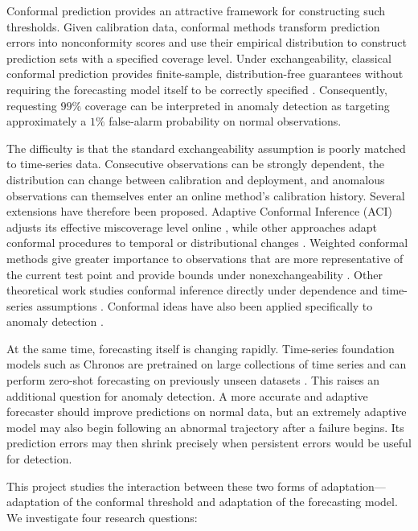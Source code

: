 \documentclass[11pt]{article}
\theoremstyle{definition}
\theoremstyle{remark}
\begin{document}
Conformal prediction provides an attractive framework for constructing such thresholds. Given calibration data, conformal methods transform prediction errors into nonconformity scores and use their empirical distribution to construct prediction sets with a specified coverage level. Under exchangeability, classical conformal prediction provides finite-sample, distribution-free guarantees without requiring the forecasting model itself to be correctly specified \cite{vovk2005algorithmic,lei2018distribution,angelopoulos2023gentle}. Consequently, requesting $99\%$ coverage can be interpreted in anomaly detection as targeting approximately a $1\%$ false-alarm probability on normal observations.

The difficulty is that the standard exchangeability assumption is poorly matched to time-series data. Consecutive observations can be strongly dependent, the distribution can change between calibration and deployment, and anomalous observations can themselves enter an online method's calibration history. Several extensions have therefore been proposed. Adaptive Conformal Inference (ACI) adjusts its effective miscoverage level online \cite{gibbs2021adaptive}, while other approaches adapt conformal procedures to temporal or distributional changes \cite{zaffran2022adaptive}. Weighted conformal methods give greater importance to observations that are more representative of the current test point and provide bounds under nonexchangeability \cite{barber2023conformal}. Other theoretical work studies conformal inference directly under dependence and time-series assumptions \cite{chernozhukov2018exact,xu2021conformal,barber2026predictive}. Conformal ideas have also been applied specifically to anomaly detection \cite{laxhammar2015inductive,bates2023testing,martinezgil2026adaptive}.

At the same time, forecasting itself is changing rapidly. Time-series foundation models such as Chronos are pretrained on large collections of time series and can perform zero-shot forecasting on previously unseen datasets \cite{ansari2024chronos}. This raises an additional question for anomaly detection. A more accurate and adaptive forecaster should improve predictions on normal data, but an extremely adaptive model may also begin following an abnormal trajectory after a failure begins. Its prediction errors may then shrink precisely when persistent errors would be useful for detection.

This project studies the interaction between these two forms of adaptation---adaptation of the conformal threshold and adaptation of the forecasting model. We investigate four research questions:
\end{document}
